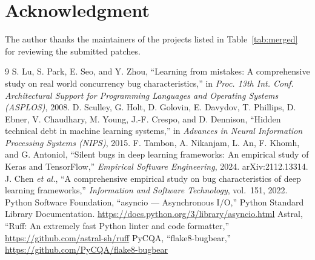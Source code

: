 \documentclass[conference]{IEEEtran}
\begin{document}
\section*{Acknowledgment}
The author thanks the maintainers of the projects listed in Table~\ref{tab:merged} for reviewing the submitted patches.

\begin{thebibliography}{9}
 S. Lu, S. Park, E. Seo, and Y. Zhou, ``Learning from mistakes: A comprehensive study on real world concurrency bug characteristics,'' in \emph{Proc. 13th Int. Conf. Architectural Support for Programming Languages and Operating Systems (ASPLOS)}, 2008.
 D. Sculley, G. Holt, D. Golovin, E. Davydov, T. Phillips, D. Ebner, V. Chaudhary, M. Young, J.-F. Crespo, and D. Dennison, ``Hidden technical debt in machine learning systems,'' in \emph{Advances in Neural Information Processing Systems (NIPS)}, 2015.
 F. Tambon, A. Nikanjam, L. An, F. Khomh, and G. Antoniol, ``Silent bugs in deep learning frameworks: An empirical study of Keras and TensorFlow,'' \emph{Empirical Software Engineering}, 2024. arXiv:2112.13314.
 J. Chen \emph{et al.}, ``A comprehensive empirical study on bug characteristics of deep learning frameworks,'' \emph{Information and Software Technology}, vol.~151, 2022.
 Python Software Foundation, ``asyncio --- Asynchronous I/O,'' Python Standard Library Documentation. \url{https://docs.python.org/3/library/asyncio.html}
 Astral, ``Ruff: An extremely fast Python linter and code formatter,'' \url{https://github.com/astral-sh/ruff}
 PyCQA, ``flake8-bugbear,'' \url{https://github.com/PyCQA/flake8-bugbear}
\end{thebibliography}
\end{document}
